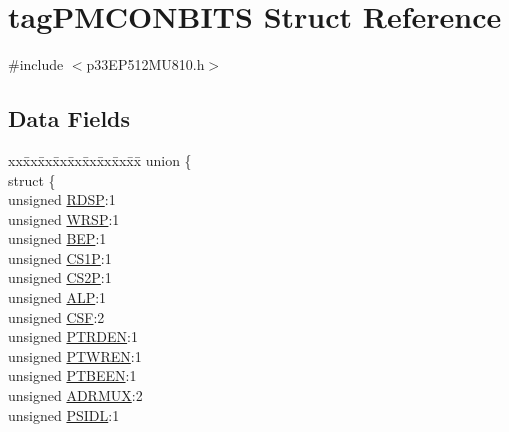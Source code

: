 \hypertarget{structtag_p_m_c_o_n_b_i_t_s}{}\section{tag\+P\+M\+C\+O\+N\+B\+I\+TS Struct Reference}
\label{structtag_p_m_c_o_n_b_i_t_s}


{\ttfamily \#include $<$p33\+E\+P512\+M\+U810.\+h$>$}

\subsection*{Data Fields}
\begin{DoxyCompactItemize}
\item 
\begin{tabbing}
xx\=xx\=xx\=xx\=xx\=xx\=xx\=xx\=xx\=\kill
union \{\\
\>struct \{\\
\>\>unsigned \hyperlink{structtag_p_m_c_o_n_b_i_t_s_a44cfcdfec13840457a2ace3829596542}{RDSP}:1\\
\>\>unsigned \hyperlink{structtag_p_m_c_o_n_b_i_t_s_afd1312cdc689ece3410e033dc20575d7}{WRSP}:1\\
\>\>unsigned \hyperlink{structtag_p_m_c_o_n_b_i_t_s_af7d87461ab40c4d68665809b62056524}{BEP}:1\\
\>\>unsigned \hyperlink{structtag_p_m_c_o_n_b_i_t_s_a680df77748323827011d1255c6b11a2c}{CS1P}:1\\
\>\>unsigned \hyperlink{structtag_p_m_c_o_n_b_i_t_s_ae5288410dcbe4081c9d4700b53c3ceff}{CS2P}:1\\
\>\>unsigned \hyperlink{structtag_p_m_c_o_n_b_i_t_s_ad6f6b65b97cc81a67951bf7e86ba1681}{ALP}:1\\
\>\>unsigned \hyperlink{structtag_p_m_c_o_n_b_i_t_s_a34205dd540cc3932ccf16f11a7fbb754}{CSF}:2\\
\>\>unsigned \hyperlink{structtag_p_m_c_o_n_b_i_t_s_a549edee0f83db940ed0a9cd6c4548041}{PTRDEN}:1\\
\>\>unsigned \hyperlink{structtag_p_m_c_o_n_b_i_t_s_a1401fd21850e180aeeb90c542a31b7f5}{PTWREN}:1\\
\>\>unsigned \hyperlink{structtag_p_m_c_o_n_b_i_t_s_afb1729fabd86d78624f0842fdc16420d}{PTBEEN}:1\\
\>\>unsigned \hyperlink{structtag_p_m_c_o_n_b_i_t_s_aaefe21f81d1b88d43cace35c188b80a1}{ADRMUX}:2\\
\>\>unsigned \hyperlink{structtag_p_m_c_o_n_b_i_t_s_a880b1426b611598b4f228d8f9ab8ab5c}{PSIDL}:1\\

\end{tabbing}
\end{DoxyCompactItemize}
